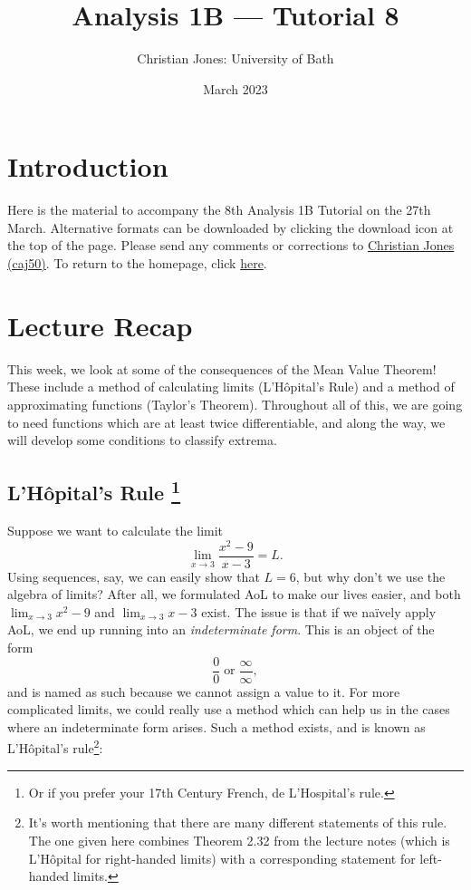 \documentclass[
  10pt,
  a4paper]{article}
\title{Analysis 1B --- Tutorial 8}
\author{Christian Jones: University of Bath}
\date{March 2023}
\theoremstyle{plain}
\theoremstyle{definition}
\theoremstyle{plain}
\theoremstyle{plain}
\theoremstyle{plain}
\theoremstyle{plain}
\theoremstyle{definition}
\theoremstyle{definition}
\theoremstyle{remark}
\theoremstyle{remark}
\begin{document}
\maketitle

{
\setcounter{tocdepth}{2}
\tableofcontents
}
\newpage
{}

\hypertarget{introduction}{%
\section*{Introduction}\label{introduction}}

Here is the material to accompany the 8th Analysis 1B Tutorial on the 27th March. Alternative formats can be downloaded by clicking the download icon at the top of the page. Please send any comments or corrections to \href{mailto:caj50@bath.ac.uk}{Christian Jones (caj50)}. To return to the homepage, click \href{http://caj50.github.io/tutoring.html}{here}.

\hypertarget{lecture-recap}{%
\section{Lecture Recap}\label{lecture-recap}}

This week, we look at some of the consequences of the Mean Value Theorem! These include a method of calculating limits (L'Hôpital's Rule) and a method of approximating functions (Taylor's Theorem). Throughout all of this, we are going to need functions which are at least twice differentiable, and along the way, we will develop some conditions to classify extrema.

\hypertarget{lhuxf4pitals-rule-1}{%
\subsection[L'Hôpital's Rule ]{\texorpdfstring{L'Hôpital's Rule \footnote{Or if you prefer your 17th Century French, de L'Hospital's rule.}}{L'Hôpital's Rule }}\label{lhuxf4pitals-rule-1}}

Suppose we want to calculate the limit \[\lim_{x \to 3} \frac{x^2 - 9}{x - 3} = L.\] Using sequences, say, we can easily show that \(L = 6\), but why don't we use the algebra of limits? After all, we formulated AoL to make our lives easier, and both \(\lim_{x \to 3} x^2 - 9\) and \(\lim_{x \to 3} x - 3\) exist. The issue is that if we naïvely apply AoL, we end up running into an \emph{indeterminate form}. This is an object of the form \[\frac{0}{0} \; \text{or} \; \frac{\infty}{\infty},\] and is named as such because we cannot assign a value to it. For more complicated limits, we could really use a method which can help us in the cases where an indeterminate form arises. Such a method exists, and is known as L'Hôpital's rule\footnote{It's worth mentioning that there are many different statements of this rule. The one given here combines Theorem 2.32 from the lecture notes (which is L'Hôpital for right-handed limits) with a corresponding statement for left-handed limits.}:
\end{document}

